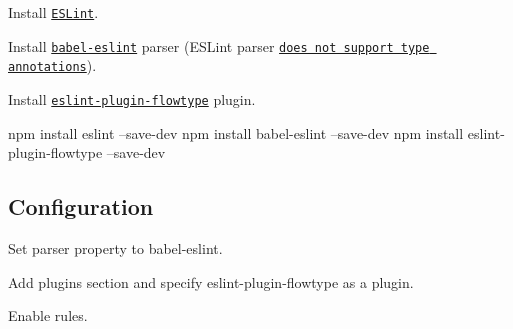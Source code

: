 \begin{DoxyEnumerate}
\item Install \href{https://www.github.com/eslint/eslint}{\tt E\+S\+Lint}.
\end{DoxyEnumerate}
\begin{DoxyEnumerate}
\item Install \href{https://github.com/babel/babel-eslint}{\tt {\ttfamily babel-\/eslint}} parser (E\+S\+Lint parser \href{https://github.com/eslint/eslint/issues/2157}{\tt does not support type annotations}).
\end{DoxyEnumerate}
\begin{DoxyEnumerate}
\item Install \href{https://github.com/gajus/eslint-plugin-flowtype}{\tt {\ttfamily eslint-\/plugin-\/flowtype}} plugin.
\end{DoxyEnumerate}


\begin{DoxyCode}
npm install eslint --save-dev
npm install babel-eslint --save-dev
npm install eslint-plugin-flowtype --save-dev
\end{DoxyCode}


\label{_eslint-plugin-flowtype-configuration}%
 \subsection*{Configuration}


\begin{DoxyEnumerate}
\item Set {\ttfamily parser} property to {\ttfamily babel-\/eslint}.
\end{DoxyEnumerate}
\begin{DoxyEnumerate}
\item Add {\ttfamily plugins} section and specify {\ttfamily eslint-\/plugin-\/flowtype} as a plugin.
\end{DoxyEnumerate}
\begin{DoxyEnumerate}
\item Enable rules.
\end{DoxyEnumerate}


